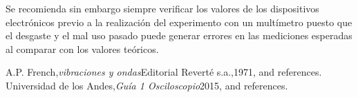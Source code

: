 \documentclass[%
 reprint,
 amsmath,amssymb,
 aps,
]{revtex4-1}
\begin{document}
Se recomienda sin embargo siempre verificar los valores de los dispositivos electr\'onicos previo a la realizaci\'on del experimento con un mult\'imetro puesto que el desgaste y el mal uso pasado puede generar errores en las mediciones esperadas al comparar con los valores te\'oricos.\\



\begin{thebibliography}{99} 
 A.P. French,{\it vibraciones y ondas}{Editorial Reverté s.a.,1971}, and references.\\ 
 Universidad de los Andes,{\it Guía 1 Osciloscopio}{2015}, and references.\\ \end{thebibliography}
\end{document}
